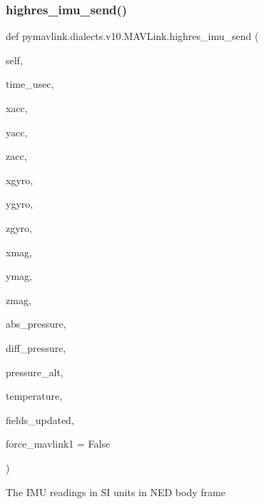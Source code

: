 \begin{DoxyVerb}
\begin{DoxyVerb}
\subsubsection{\texorpdfstring{highres\+\_\+imu\+\_\+send()}{highres\_imu\_send()}}
{\footnotesize\ttfamily def pymavlink.\+dialects.\+v10.\+M\+A\+V\+Link.\+highres\+\_\+imu\+\_\+send (\begin{DoxyParamCaption}\item[{}]{self,  }\item[{}]{time\+\_\+usec,  }\item[{}]{xacc,  }\item[{}]{yacc,  }\item[{}]{zacc,  }\item[{}]{xgyro,  }\item[{}]{ygyro,  }\item[{}]{zgyro,  }\item[{}]{xmag,  }\item[{}]{ymag,  }\item[{}]{zmag,  }\item[{}]{abs\+\_\+pressure,  }\item[{}]{diff\+\_\+pressure,  }\item[{}]{pressure\+\_\+alt,  }\item[{}]{temperature,  }\item[{}]{fields\+\_\+updated,  }\item[{}]{force\+\_\+mavlink1 = {\ttfamily False} }\end{DoxyParamCaption})}

\begin{DoxyVerb}The IMU readings in SI units in NED body frame


\end{DoxyVerb}
\end{DoxyVerb}
\end{DoxyVerb}
